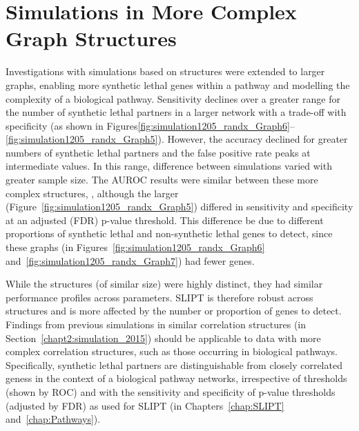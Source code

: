 \section{Simulations in More Complex Graph Structures}
\label{chapt5:complex_graphs}
Investigations with simulations based on  structures were extended to larger \glspl{graph}, enabling more synthetic lethal genes within a pathway and modelling the complexity of a biological pathway. Sensitivity declines over a greater range for the number of \gls{synthetic lethal} partners in a larger network with a trade-off with specificity (as shown in Figures\ref{fig:simulation1205_randx_Graph6}\nobreakdash--\ref{fig:simulation1205_randx_Graph5}). However, the accuracy declined for greater numbers of \gls{synthetic lethal} partners and the false positive rate peaks at intermediate values. In this range, difference between simulations varied with greater sample size. The \gls{AUROC} results were similar between these more complex  structures, , although the larger  (Figure~\ref{fig:simulation1205_randx_Graph5}) differed in sensitivity and specificity at an adjusted (\gls{FDR}) p-value threshold. This difference be due to different proportions of \gls{synthetic lethal} and non-synthetic lethal genes to detect, since these \glspl{graph} (in Figures~\ref{fig:simulation1205_randx_Graph6} and~\ref{fig:simulation1205_randx_Graph7}) had fewer genes. %

While the  structures (of similar size) were highly distinct, they had similar performance profiles across parameters. \gls{SLIPT} is therefore robust across  structures and is more affected by the number or proportion of genes to detect. Findings from previous simulations in similar correlation structures (in Section~\ref{chapt2:simulation_2015}) should be applicable to  data with more complex correlation structures, such as those occurring in biological pathways. Specifically, \gls{synthetic lethal} partners are distinguishable from closely correlated geness in the context of a biological pathway networks, irrespective of thresholds (shown by \gls{ROC}) and with the sensitivity and specificity of p-value thresholds (adjusted by \gls{FDR}) as used for \gls{SLIPT} (in Chapters~\ref{chap:SLIPT} and~\ref{chap:Pathways}).



